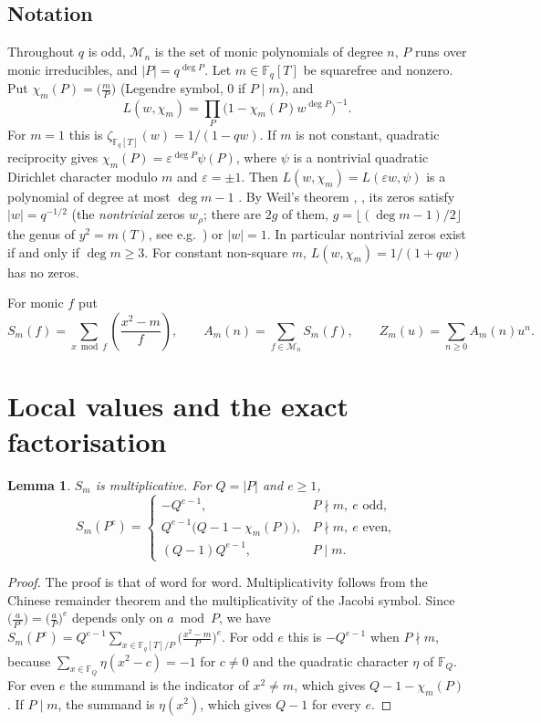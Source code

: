 \documentclass[11pt]{amsart}
\newtheorem{lemma}{Lemma}
\theoremstyle{remark}
\newcommand{\jac}[2]{\left(\frac{#1}{#2}\right)}
\newcommand{\Fq}{\mathbb{F}_q}
\newcommand{\cM}{\mathcal{M}}
\begin{document}
\subsection*{Notation}
Throughout $q$ is odd, $\cM_n$ is the set of monic polynomials of degree $n$, $P$ runs over monic irreducibles, and $|P|=q^{\deg P}$. Let $m\in\Fq[T]$ be squarefree and nonzero. Put $\chi_m(P)=\big(\frac mP\big)$ (Legendre symbol, $0$ if $P\mid m$), and
\[
L(w,\chi_m)=\prod_{P}\big(1-\chi_m(P)w^{\deg P}\big)^{-1}.
\]
For $m=1$ this is $\zeta_{\Fq[T]}(w)=1/(1-qw)$. If $m$ is not constant, quadratic reciprocity \cite[Thm.~3.3]{R} gives $\chi_m(P)=\varepsilon^{\deg P}\psi(P)$, where $\psi$ is a nontrivial quadratic Dirichlet character modulo $m$ and $\varepsilon=\pm1$. Then $L(w,\chi_m)=L(\varepsilon w,\psi)$ is a polynomial of degree at most $\deg m-1$ \cite[Prop.~4.3]{R}. By Weil's theorem \cite[Thm.~5.10]{R}, \cite{W}, its zeros satisfy $|w|=q^{-1/2}$ (the \emph{nontrivial} zeros $w_\rho$; there are $2g$ of them, $g=\lfloor(\deg m-1)/2\rfloor$ the genus of $y^2=m(T)$, see e.g.\ \cite{AK}) or $|w|=1$. In particular nontrivial zeros exist if and only if $\deg m\ge3$. For constant non-square $m$, $L(w,\chi_m)=1/(1+qw)$ has no zeros.

For monic $f$ put
\[
S_m(f)=\sum_{x\bmod f}\jac{x^2-m}{f},\qquad A_m(n)=\sum_{f\in\cM_n}S_m(f),\qquad Z_m(u)=\sum_{n\ge0}A_m(n)u^n .
\]

\section{Local values and the exact factorisation}

\begin{lemma}\label{lem:loc}
$S_m$ is multiplicative. For $Q=|P|$ and $e\ge1$,
\[
S_m(P^e)=\begin{cases}-Q^{e-1}, & P\nmid m,\ e\text{ odd},\\ Q^{e-1}\big(Q-1-\chi_m(P)\big), & P\nmid m,\ e\text{ even},\\ (Q-1)Q^{e-1}, & P\mid m.\end{cases}
\]
\end{lemma}

\begin{proof}
The proof is that of \cite[Lemma~1]{K} word for word. Multiplicativity follows from the Chinese remainder theorem and the multiplicativity of the Jacobi symbol. Since $\big(\frac a{P^e}\big)=\big(\frac aP\big)^e$ depends only on $a\bmod P$, we have $S_m(P^e)=Q^{e-1}\sum_{x\in\Fq[T]/P}\big(\frac{x^2-m}P\big)^e$. For odd $e$ this is $-Q^{e-1}$ when $P\nmid m$, because $\sum_{x\in\mathbb F_Q}\eta(x^2-c)=-1$ for $c\ne0$ and the quadratic character $\eta$ of $\mathbb F_Q$. For even $e$ the summand is the indicator of $x^2\ne m$, which gives $Q-1-\chi_m(P)$. If $P\mid m$, the summand is $\eta(x^2)$, which gives $Q-1$ for every $e$.
\end{proof}
\end{document}
